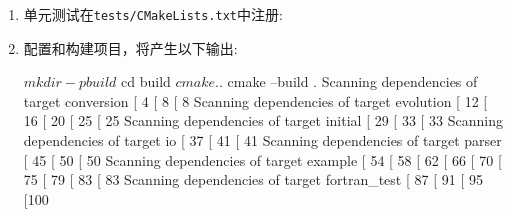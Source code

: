 \begin{enumerate}
\item 单元测试在\texttt{tests/CMakeLists.txt}中注册:


\item 配置和构建项目，将产生以下输出:

\begin{codebox}[shell]
$ mkdir -p build
$ cd build
$ cmake ..
$ cmake --build .
Scanning dependencies of target conversion
[ 4%
[ 8%
[ 8%
Scanning dependencies of target evolution
[ 12%
[ 16%
[ 20%
[ 25%
[ 25%
Scanning dependencies of target initial
[ 29%
[ 33%
[ 33%
Scanning dependencies of target io
[ 37%
[ 41%
[ 41%
Scanning dependencies of target parser
[ 45%
[ 50%
[ 50%
Scanning dependencies of target example
[ 54%
[ 58%
[ 62%
[ 66%
[ 70%
[ 75%
[ 79%
[ 83%
[ 83%
Scanning dependencies of target fortran_test
[ 87%
[ 91%
[ 95%
[100%
\end{codebox}


\end{enumerate}
